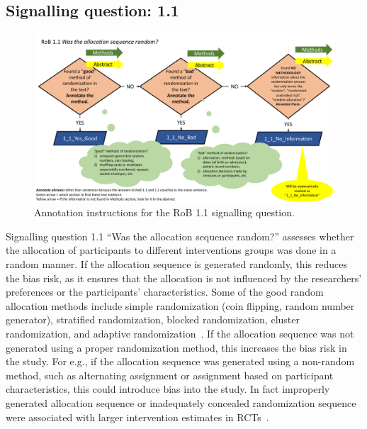 \documentclass[sn-mathphys,Numbered]{sn-jnl}%
\begin{document}
\subsection*{Signalling question: 1.1}
\label{subsec:1_1}
%
\begin{figure}[hbt]
    \centering
    \includegraphics[width=\textwidth]{figures/1_1.pdf}
    \caption{Annotation instructions for the RoB 1.1 signalling question.}
    \label{fig:1_1}
\end{figure}
%
%
%



Signalling question 1.1 ``Was the allocation sequence random?'' assesses whether the allocation of participants to different interventions groups was done in a random manner.
If the allocation sequence is generated randomly, this reduces the bias risk, as it ensures that the allocation is not influenced by the researchers' preferences or the participants' characteristics.
Some of the good random allocation methods include simple randomization (coin flipping, random number generator), stratified randomization, blocked randomization, cluster randomization, and adaptive randomization~\cite{sterne2019rob}.
If the allocation sequence was not generated using a proper randomization method, this increases the bias risk in the study.
For e.g., if the allocation sequence was generated using a non-random method, such as alternating assignment or assignment based on participant characteristics, this could introduce bias into the study.
In fact improperly generated allocation sequence or inadequately concealed randomization sequence were associated with larger intervention estimates in RCTs~\cite{bello2017contemporary}.
\end{document}
